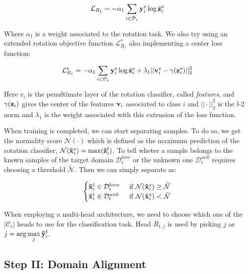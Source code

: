 \documentclass[10pt,twocolumn,letterpaper]{article}
\begin{document}
\begin{equation}
  \mathcal{L}_{R_1} = -\alpha_1\sum_{i\in\mathcal{\tilde{D}}_s} {\bf y}_i^s \log \tilde{{\bf z}}_i^s
  \label{eq:baseloss_rot}
\end{equation}

Where $\alpha_1$ is a weight associated to the rotation task.
We also try using an extended rotation objective function $\mathcal{L}_{R_1}^*$ also implementing a center loss function\cite{CenterLoss}:

\begin{equation}
  \mathcal{L}_{R_1}^* = -\alpha_1\sum_{i\in\mathcal{D}_s} {\bf y}_i^s \log \tilde{{\bf z}}_i^s+\lambda_1||{\bf v}_i^s-\gamma({\bf z}_i^s)||_2^2
  \label{eq:center_loss}
\end{equation}

Here {\bf $v_i$} is the penultimate layer of the rotation classifier, called {\it features}, and $\gamma({\bf z}_i)$ gives the center of the features ${\bf v}_i$ associated to class $i$ and $||\cdot||_2^2$ is the $l$-2 norm and $\lambda_1$ is the weight associated with this extension of the loss function.

When training is completed, we can start separating samples.
To do so, we get the normality score $\mathcal{N}(\cdot)$ which is defined as the maximum prediction of the rotation classifier, $\mathcal{N}({\bf\tilde{x}}_i^s) = \max({\bf\tilde{z}}_i^t)$.
To tell wheter a sample belongs to the known samples of the target domain $\mathcal{D}_t^{knw}$ or the unknown one $\mathcal{D}_t^{unk}$ requires choosing a threshold $\tilde{\mathcal{N}}$.
Then we can simply separate as:

\begin{equation}
  \begin{cases}
    {\bf\tilde x}_i^t \in \mathcal{D}_t^{knw} & \text{ if } \mathcal{N}({\bf\tilde x}_i^s) \geq \tilde{\mathcal{N}} \\
    {\bf\tilde x}_i^t \in \mathcal{D}_t^{unk} & \text{ if } \mathcal{N}({\bf\tilde x}_i^s) < \tilde{\mathcal{N}}
  \end{cases}
  \label{eq:sample_separation}
\end{equation}

When employing a multi-head architecture, we need to choose which one of the $|\mathcal{C}_s|$ heads to use for the classification task.
Head $R_{1,j}$ is used by picking $j$ as $\displaystyle j = \arg\max_j {\bf\tilde{y}}_i^t$.

\subsection{Step II: Domain Alignment}
\label{sec:domain_alignment}
\end{document}
